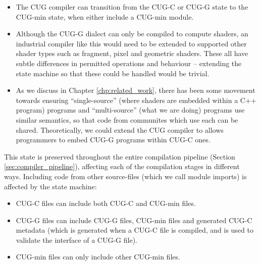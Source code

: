 \documentclass[a4paper,12pt,twoside,openright]{report}
\begin{document}
\begin{itemize}

    \item The CUG compiler can transition from the CUG-C or CUG-G state to the
    CUG-min state, when either include a CUG-min module.

    \item Although the CUG-G dialect can only be compiled to compute shaders,
    an industrial compiler like this would need to be extended to supported
    other shader types such as fragment, pixel and geometric shaders. These all
    have subtle differences in permitted operations and behaviour -- extending
    the state machine so that these could be handled would be trivial.

    \item As we discuss in Chapter \ref{chp:related_work}, there has been some
    movement towards ensuring ``single-source'' (where shaders are embedded
    within a C++ program) programs and ``multi-source'' (what we are doing)
    programs use similar semantics, so that code from communites which use each
    can be shared. Theoretically, we could extend the CUG compiler to allows
    programmers to embed CUG-G programs within CUG-C ones.

\end{itemize}

This state is preserved throughout the entire compilation pipeline (Section
\ref{sec:compiler_pipeline}), affecting each of the compilation stages in
different ways. Including code from other source-files (which we call module
imports) is affected by the state machine:

\begin{itemize}

    \item CUG-C files can include both CUG-C and CUG-min files.

    \item CUG-G files can include CUG-G files, CUG-min files and generated
    CUG-C metadata (which is generated when a CUG-C file is compiled, and is
    used to validate the interface of a CUG-G file).

    \item CUG-min files can only include other CUG-min files.

\end{itemize}

\end{document}
